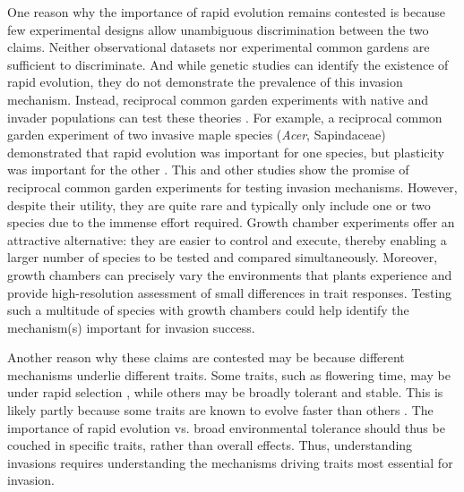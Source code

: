 \documentclass[12pt]{article}\usepackage[]{graphicx}\usepackage[]{color}
\begin{document}
	One reason why the importance of rapid evolution remains contested is because few experimental designs allow unambiguous discrimination between the two claims. Neither observational datasets \parencite[e.g.,][]{Wolkovich2013} nor experimental common gardens \parencite{Conner2004,Vitasse2009} are sufficient to discriminate. And while genetic studies can identify the existence of rapid evolution, they do not demonstrate the prevalence of this invasion mechanism. Instead, reciprocal common garden experiments with native and invader populations can test these theories \parencite[e.g.,][]{Lamarque2015,Williams2008}. For example, a reciprocal common garden experiment of two invasive maple species (\textit{Acer}, Sapindaceae) demonstrated that rapid evolution was important for one species, but plasticity was important for the other \parencite{Lamarque2015}.  This and other studies show the promise of reciprocal common garden experiments for testing invasion mechanisms. However, despite their utility, they are quite rare and typically only include one or two species due to the immense effort required. Growth chamber experiments offer an attractive alternative: they are easier to control and execute, thereby enabling a larger number of species to be tested and compared simultaneously. Moreover, growth chambers can precisely vary the environments that plants experience and provide high-resolution assessment of small differences in trait responses. Testing such a multitude of species with growth chambers could help identify the mechanism(s) important for invasion success.  
	
	Another reason why these claims are contested may be because different mechanisms underlie different traits. Some traits, such as flowering time, may be under rapid selection \parencite{Weber1998}, while others may be broadly tolerant and stable. This is likely partly because some traits are known to evolve faster than others \parencite{Weiss-Lehman2017}. The importance of rapid evolution vs. broad environmental tolerance should thus be couched in specific traits, rather than overall effects. Thus,  understanding invasions requires understanding the mechanisms driving traits most essential for invasion.
	
\end{document}
